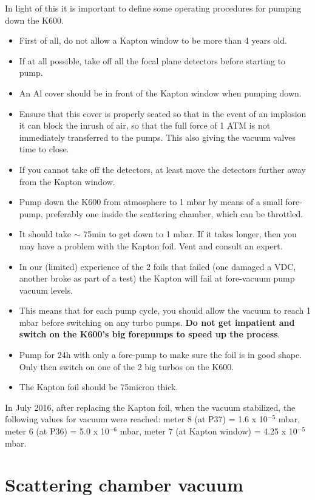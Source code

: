 \documentclass[11pt]{report}
\begin{document}
In light of this it is important to define some operating procedures for pumping down the K600.
\begin{itemize}
\item First of all, do not allow a Kapton window to be more than 4 years old.
\item If at all possible, take off all the focal plane detectors before starting to pump.
\item An Al cover should be in front of the Kapton window when pumping down. 
\item Ensure that this cover is properly seated so that in the event of an implosion it can 
block the inrush of air, so that the full force of 1 ATM is not immediately transferred to the pumps.
This also giving the vacuum valves time to close.
\item
If you cannot take off the detectors, at least move the detectors further away from the Kapton window.
\item Pump down the K600 from atmosphere to 1 mbar by means of a small fore-pump, preferably one
inside the scattering chamber, which can be throttled.
\item It should take $\sim$ 75min to get down to 1 mbar. If it takes longer, then you may have
a problem with the Kapton foil. Vent and consult an expert.
\item In our (limited) experience of the 2 foils that failed (one damaged a VDC, another broke as 
part of a test) the Kapton will fail at fore-vacuum pump vacuum levels. 
\item This means that for each pump cycle, you should allow the vacuum to reach 1 mbar before switching
on any turbo pumps. {\bf Do not get impatient and switch on the K600's big forepumps to speed up the process}.
\item Pump for 24h with only a fore-pump to make sure the foil is in good shape. Only then switch on one of 
the 2 big turbos on the K600.
\item The Kapton foil should be 75micron thick.


\end{itemize}

\noindent In July 2016, after replacing the Kapton foil, when the vacuum stabilized, the following values for vacuum were 
reached:
meter 8 (at P37) = 1.6 x 10$^{-5}$ mbar,
meter 6 (at P36) = 5.0 x 10$^{-6}$ mbar,
meter 7 (at Kapton window) = 4.25 x 10$^{-5}$ mbar.


\section{Scattering chamber vacuum}\label{sec:Scattering-Chamber-Vacuum}
\end{document}
